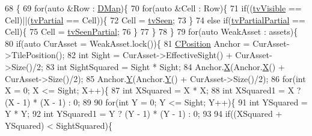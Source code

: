 \begin{DoxyCode}
68                                                                                \{
69     \textcolor{keywordflow}{for}(\textcolor{keyword}{auto} &Row : \hyperlink{classCVisibilityMap_ad217bc34f7a50dd357a3eeeb69cfdd85}{DMap})\{
70         \textcolor{keywordflow}{for}(\textcolor{keyword}{auto} &Cell : Row)\{
71             \textcolor{keywordflow}{if}((\hyperlink{classCVisibilityMap_a6665f905da08825adbb0eee7bd1f2f30a3c881652ef7164aa086e595eef0ff5d6}{tvVisible} == Cell)||(\hyperlink{classCVisibilityMap_a6665f905da08825adbb0eee7bd1f2f30a0037f47075e3bde5e8e32dbd55754976}{tvPartial} == Cell))\{
72                 Cell = \hyperlink{classCVisibilityMap_a6665f905da08825adbb0eee7bd1f2f30ab7c30a117286ac3a8891862f6c1bb5c6}{tvSeen};
73             \}
74             \textcolor{keywordflow}{else} \textcolor{keywordflow}{if}(\hyperlink{classCVisibilityMap_a6665f905da08825adbb0eee7bd1f2f30a75af969b6d667b802b64bacd8bca7b63}{tvPartialPartial} == Cell)\{
75                 Cell = \hyperlink{classCVisibilityMap_a6665f905da08825adbb0eee7bd1f2f30a7f9292f5d7ed9e9497f8ef342c890466}{tvSeenPartial};   
76             \}
77         \}
78     \}
79     \textcolor{keywordflow}{for}(\textcolor{keyword}{auto} WeakAsset : assets)\{
80         \textcolor{keywordflow}{if}(\textcolor{keyword}{auto} CurAsset = WeakAsset.lock())\{
81             \hyperlink{classCPosition}{CPosition} Anchor = CurAsset->TilePosition();
82             \textcolor{keywordtype}{int} Sight = CurAsset->EffectiveSight() + CurAsset->Size()/2;
83             \textcolor{keywordtype}{int} SightSquared = Sight * Sight;
84             Anchor.\hyperlink{classCPosition_a9a6b94d3b91df1492d166d9964c865fc}{X}(Anchor.\hyperlink{classCPosition_a9a6b94d3b91df1492d166d9964c865fc}{X}() + CurAsset->Size()/2);
85             Anchor.\hyperlink{classCPosition_a1aa8a30e2f08dda1f797736ba8c13a87}{Y}(Anchor.\hyperlink{classCPosition_a1aa8a30e2f08dda1f797736ba8c13a87}{Y}() + CurAsset->Size()/2);
86             \textcolor{keywordflow}{for}(\textcolor{keywordtype}{int} X = 0; X <= Sight; X++)\{
87                 \textcolor{keywordtype}{int} XSquared = X * X;
88                 \textcolor{keywordtype}{int} XSquared1 = X ? (X - 1) * (X - 1) : 0;
89                 
90                 \textcolor{keywordflow}{for}(\textcolor{keywordtype}{int} Y = 0; Y <= Sight; Y++)\{
91                     \textcolor{keywordtype}{int} YSquared = Y * Y;
92                     \textcolor{keywordtype}{int} YSquared1 = Y ? (Y - 1) * (Y - 1) : 0;
93                     
94                     \textcolor{keywordflow}{if}((XSquared + YSquared) < SightSquared)\{

\end{DoxyCode}

